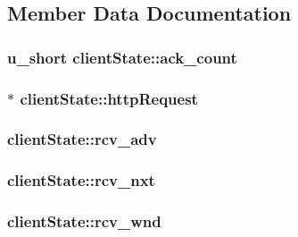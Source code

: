 \subsection{\-Member \-Data \-Documentation}
\hypertarget{structclientState_a10d1f7df178df86fdda2dfe98839304f}{
\subsubsection[{ack\-\_\-count}]{\setlength{\rightskip}{0pt plus 5cm}u\-\_\-short {\bf client\-State\-::ack\-\_\-count}}}\label{structclientState_a10d1f7df178df86fdda2dfe98839304f}
\hypertarget{structclientState_a022596d79ef75035f7cc5bdc33aba18b}{
\subsubsection[{http\-Request}]{$\ast$ {\bf client\-State\-::http\-Request}}}\label{structclientState_a022596d79ef75035f7cc5bdc33aba18b}
\hypertarget{structclientState_a0cfca459ca80f60fb437270fd6ffffad}{
\subsubsection[{rcv\-\_\-adv}]{ {\bf client\-State\-::rcv\-\_\-adv}}}\label{structclientState_a0cfca459ca80f60fb437270fd6ffffad}
\hypertarget{structclientState_a552b5e5350327c8b4cf62bc29cbdf365}{
\subsubsection[{rcv\-\_\-nxt}]{ {\bf client\-State\-::rcv\-\_\-nxt}}}\label{structclientState_a552b5e5350327c8b4cf62bc29cbdf365}
\hypertarget{structclientState_a5ca796c5aec186e39e85c726370a8b36}{
\subsubsection[{rcv\-\_\-wnd}]{ {\bf client\-State\-::rcv\-\_\-wnd}}}\label{structclientState_a5ca796c5aec186e39e85c726370a8b36}
